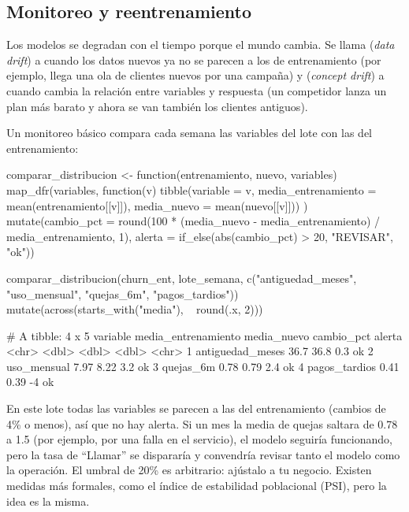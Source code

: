 \subsection{Monitoreo y reentrenamiento}

Los modelos se degradan con el tiempo porque el mundo cambia. Se llama
 (\emph{data drift}) a cuando los datos nuevos ya no
se parecen a los de entrenamiento (por ejemplo, llega una ola de clientes
nuevos por una campaña) y  (\emph{concept drift})
a cuando cambia la relación entre variables y respuesta (un competidor lanza
un plan más barato y ahora se van también los clientes antiguos).

Un monitoreo básico compara cada semana las variables del lote con las del
entrenamiento:

\begin{rcode}
comparar_distribucion <- function(entrenamiento, nuevo, variables) {
  map_dfr(variables, function(v) {
    tibble(variable = v,
           media_entrenamiento = mean(entrenamiento[[v]]),
           media_nuevo = mean(nuevo[[v]]))
  }) %
    mutate(cambio_pct = round(100 * (media_nuevo - media_entrenamiento) /
                                media_entrenamiento, 1),
           alerta = if_else(abs(cambio_pct) > 20, "REVISAR", "ok"))
}

comparar_distribucion(churn_ent, lote_semana,
                      c("antiguedad_meses", "uso_mensual", "quejas_6m",
                        "pagos_tardios")) %
  mutate(across(starts_with("media"), ~ round(.x, 2)))
\end{rcode}

\begin{rsalida}
# A tibble: 4 x 5
  variable         media_entrenamiento media_nuevo cambio_pct alerta
  <chr>                          <dbl>       <dbl>      <dbl> <chr> 
1 antiguedad_meses               36.7        36.8         0.3 ok    
2 uso_mensual                     7.97        8.22        3.2 ok    
3 quejas_6m                       0.78        0.79        2.4 ok    
4 pagos_tardios                   0.41        0.39       -4   ok    
\end{rsalida}

En este lote todas las variables se parecen a las del entrenamiento (cambios
de 4\% o menos), así que no hay alerta. Si un mes la media de quejas saltara
de 0.78 a 1.5 (por ejemplo, por una falla en el servicio), el modelo seguiría
funcionando, pero la tasa de ``Llamar'' se dispararía y convendría revisar
tanto el modelo como la operación. El umbral de 20\% es arbitrario: ajústalo a
tu negocio. Existen medidas más formales, como el índice de estabilidad
poblacional (PSI), pero la idea es la misma.

